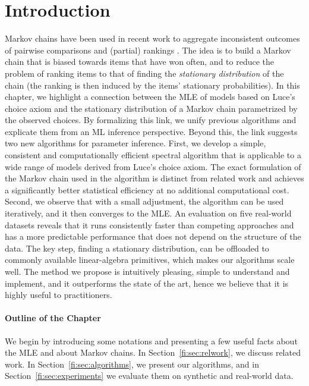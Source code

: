 \section{Introduction}
\label{fi:sec:intro}

Markov chains have been used in recent work to aggregate inconsistent outcomes of pairwise comparisons and (partial) rankings \citep{dwork2001rank, negahban2012iterative, azari2013generalized}.
The idea is to build a Markov chain that is biased towards items that have won often, and to reduce the problem of ranking items to that of finding the \emph{stationary distribution} of the chain (the ranking is then induced by the items' stationary probabilities).
In this chapter, we highlight a connection between the MLE of models based on Luce's choice axiom and the stationary distribution of a Markov chain parametrized by the observed choices.
By formalizing this link, we unify previous algorithms and explicate them from an ML inference perspective.
Beyond this, the link suggests two new algorithms for parameter inference.
First, we develop a simple, consistent and computationally efficient spectral algorithm that is applicable to a wide range of models derived from Luce's choice axiom.
The exact formulation of the Markov chain used in the algorithm is distinct from related work \citep{negahban2012iterative, azari2013generalized} and achieves a significantly better statistical efficiency at no additional computational cost.
Second, we observe that with a small adjustment, the algorithm can be used iteratively, and it then converges to the MLE.
An evaluation on five real-world datasets reveals that it runs consistently faster than competing approaches and has a more predictable performance that does not depend on the structure of the data.
The key step, finding a stationary distribution, can be offloaded to commonly available linear-algebra primitives, which makes our algorithms  scale well.
The method we propose is intuitively pleasing, simple to understand and implement, and it outperforms the state of the art, hence we believe that it is highly useful to practitioners.

\paragraph{Outline of the Chapter}
We begin by introducing some notations and presenting a few useful facts about the MLE and about Markov chains.
In Section~\ref{fi:sec:relwork}, we discuss related work.
In Section~\ref{fi:sec:algorithms}, we present our algorithms, and in Section~\ref{fi:sec:experiments} we evaluate them on synthetic and real-world data.


